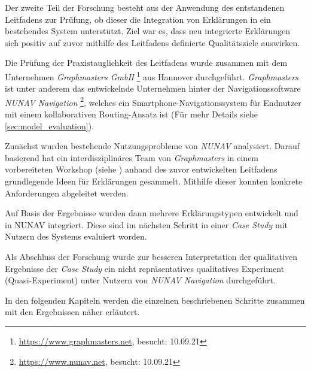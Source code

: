 \bigbreak

Der zweite Teil der Forschung besteht aus der Anwendung des entstandenen Leitfadens zur Prüfung, ob dieser die Integration von Erklärungen in ein bestehendes System unterstützt. Ziel war es, dass neu integrierte Erklärungen sich positiv auf zuvor mithilfe des Leitfadens definierte Qualitätsziele auswirken.

Die Prüfung der Praxistauglichkeit des Leitfadens wurde zusammen mit dem Unternehmen \textit{Graphmasters GmbH} \footnote{\url{https://www.graphmasters.net}, besucht: 10.09.21} aus Hannover durchgeführt. \textit{Graphmasters} ist unter anderem das entwickelnde Unternehmen hinter der Navigationssoftware \textit{NUNAV Navigation} \footnote{\url{https://www.nunav.net}, besucht: 10.09.21}, welches ein Smartphone-Navigationssystem für Endnutzer mit einem kollaborativen Routing-Ansatz ist (Für mehr Details siehe \autoref{sec:model_evaluation}).

Zunächst wurden bestehende Nutzungsprobleme von \textit{NUNAV} analysiert. Darauf basierend hat ein interdisziplinäres Team von \textit{Graphmasters} in einem vorbereiteten Workshop (siehe ) anhand des zuvor entwickelten Leitfadens grundlegende Ideen für Erklärungen gesammelt. Mithilfe dieser konnten konkrete Anforderungen abgeleitet werden.

Auf Basis der Ergebnisse wurden dann mehrere Erklärungstypen entwickelt und in NUNAV integriert. Diese sind im nächsten Schritt in einer \textit{Case Study} mit Nutzern des Systems evaluiert worden.

Als Abschluss der Forschung wurde zur besseren Interpretation der qualitativen Ergebnisse der \textit{Case Study} ein nicht repräsentatives qualitatives Experiment (Quasi-Experiment) unter Nutzern von \textit{NUNAV Navigation} durchgeführt.

\bigskip

In den folgenden Kapiteln werden die einzelnen beschriebenen Schritte zusammen mit den Ergebnissen näher erläutert.